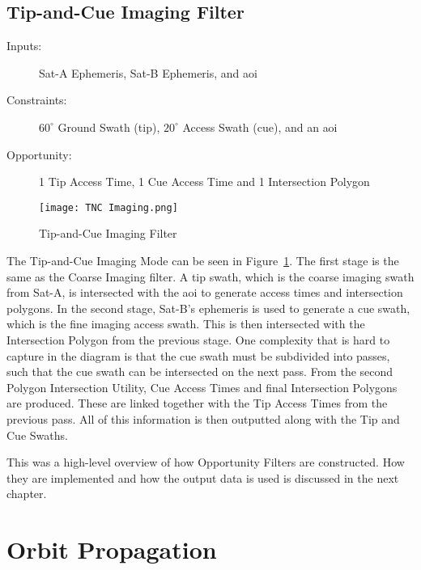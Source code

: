\subsection{Tip-and-Cue Imaging Filter}

\begin{description} 

    \item[Inputs:]  Sat-A Ephemeris, Sat-B Ephemeris, and  \gls{aoi}

    \item[Constraints:] $60^\circ$ Ground Swath (tip), $20^\circ$ Access Swath (cue), and an \gls{aoi}

    \item[Opportunity:] 1 Tip Access Time, 1 Cue Access Time and 1 Intersection Polygon

\end{description} 

\begin{figure}[h]
    \centering
    \texttt{[image: TNC Imaging.png]} 
    \caption{Tip-and-Cue Imaging Filter}
    \label{fig:filter-2} 
\end{figure}


The Tip-and-Cue Imaging Mode can be seen in Figure~\ref{fig:filter-2}. The
first stage is the same as the Coarse Imaging filter. A tip swath, which is the
coarse imaging swath from Sat-A, is intersected with the \gls{aoi} to generate
access times and intersection polygons. In the second stage, Sat-B's ephemeris
is used to generate a cue swath, which is the fine imaging access swath. This
is then intersected with the Intersection Polygon from the previous stage. One
complexity that is hard to capture in the diagram is that the cue swath must be
subdivided into passes, such that the cue swath can be intersected on the next
pass. From the second Polygon Intersection Utility, Cue Access Times and final
Intersection Polygons are produced. These are linked together with the Tip
Access Times from the previous pass. All of this information is then outputted
along with the Tip and Cue Swaths.

This was a high-level overview of how Opportunity Filters are constructed. How
they are implemented and how the output data is used is discussed in the next
chapter.


\section{Orbit Propagation}

